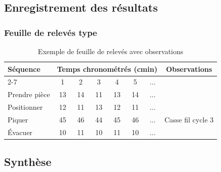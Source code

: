 \documentclass[a4paper,12pt]{article}
\begin{document}
\begin{center}
\end{center}

\subsection{Enregistrement des résultats}

\subsubsection{Feuille de relevés type}

\begin{table}[ht]
\centering
\begin{tabular}{|l|c|c|c|c|c|c|c|}
\hline
\textbf{Séquence} & \multicolumn{6}{|c|}{\textbf{Temps chronométrés (cmin)}} & \textbf{Observations} \\
\cline{2-7}
 & 1 & 2 & 3 & 4 & 5 & ... & \\
\hline
Prendre pièce & 13 & 14 & 11 & 13 & 14 & ... & \\
\hline
Positionner & 12 & 11 & 13 & 12 & 11 & ... & \\
\hline
Piquer & 45 & 46 & 44 & 45 & 46 & ... & Casse fil cycle 3 \\
\hline
Évacuer & 10 & 11 & 10 & 11 & 10 & ... & \\
\hline
\end{tabular}
\caption{Exemple de feuille de relevés avec observations}
\end{table}

\subsection{Synthèse}
\end{document}
